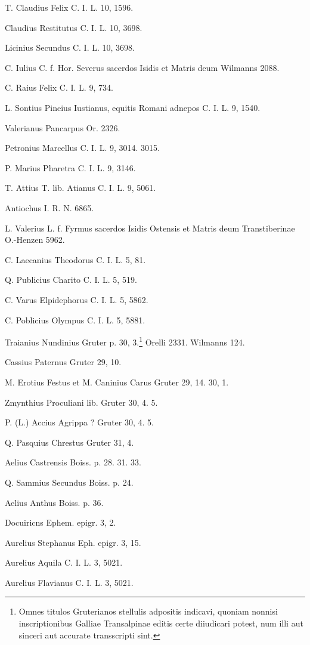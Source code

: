 \documentclass[a4paper, 11pt, oneside, polutonikogreek, german, twocolumn]{article}
\begin{document}
T. Claudius Felix C. I. L. 10, 1596.

Claudius Restitutus C. I. L. 10, 3698.

Licinius Secundus C. I. L. 10, 3698.

C. Iulius C. f. Hor. Severus sacerdos Isidis et Matris deum Wilmanns 2088.

C. Raius Felix C. I. L. 9, 734.

L. Sontius Pineius Iustianus, equitis Romani adnepos C. I. L. 9, 1540.

Valerianus Pancarpus Or. 2326.

Petronius Marcellus C. I. L. 9, 3014. 3015.

P. Marius Pharetra C. I. L. 9, 3146.

T. Attius T. lib. Atianus C. I. L. 9, 5061.

Antiochus I. R. N. 6865.

L. Valerius L. f. Fyrmus sacerdos Isidis Ostensis et Matris deum Transtiberinae O.-Henzen 5962.

C. Laecanius Theodorus C. I. L. 5, 81.

Q. Publicius Charito C. I. L. 5, 519.

C. Varus Elpidephorus C. I. L. 5, 5862.

C. Poblicius Olympus C. I. L. 5, 5881.

Traianius Nundinius Gruter p. 30, 3.\footnote{Omnes titulos Gruterianos stellulis adpositis indicavi, quoniam nonnisi inscriptionibus Galliae Transalpinae editis certe diiudicari potest, num illi aut sinceri aut accurate transscripti sint.} Orelli 2331. Wilmanns 124.

Cassius Paternus Gruter 29, 10.

M. Erotius Festus et M. Caninius Carus Gruter 29, 14. 30, 1.

Zmynthius Proculiani lib. Gruter 30, 4. 5.

P. (L.) Accius Agrippa ? Gruter 30, 4. 5.

Q. Pasquius Chrestus Gruter 31, 4.

Aelius Castrensis Boiss. p. 28. 31. 33.

Q. Sammius Secundus Boiss. p. 24.

Aelius Anthus Boiss. p. 36.

Docuiricns Ephem. epigr. 3, 2.

Aurelius Stephanus Eph. epigr. 3, 15.

Aurelius Aquila C. I. L. 3, 5021.

Aurelius Flavianus C. I. L. 3, 5021.
\end{document}

